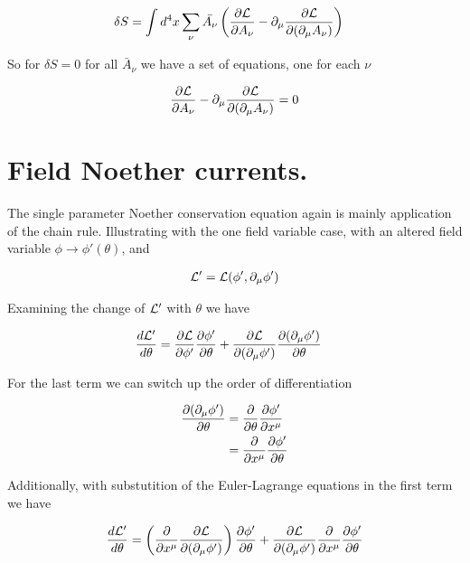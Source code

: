 \begin{align}\label{eqn:rotationCurrents:boo6}
\delta S
&=
\int d^4 x \sum_{\nu} \bar{A_\nu} \left( \PD{A_\nu}{\LL} - \partial_\mu \PD{(\partial_\mu A_\nu)}{\LL} \right)
\end{align}

So for $\delta S = 0$ for all $\bar{A}_\nu$ we have a set of equations, one for each $\nu$

\begin{align}\label{eqn:rotationCurrents:boo7}
\PD{A_\nu}{\LL} - \partial_\mu \PD{(\partial_\mu A_\nu)}{\LL} = 0
\end{align}

\section{Field Noether currents.}

The single parameter Noether conservation equation again is mainly application of the chain rule.  Illustrating with the one field variable case, with an altered field variable $\phi \rightarrow \phi'(\theta)$, and

\begin{align}\label{eqn:rotationCurrents:moo1}
\LL' = \LL(\phi', \partial_\mu \phi')
\end{align}

Examining the change of $\LL'$ with $\theta$ we have

\begin{align*}
\frac{d \LL'}{d \theta}
&=
\PD{\phi'}{\LL} \PD{\theta}{\phi'}
+\PD{(\partial_\mu \phi')}{\LL}
\PD{\theta}{(\partial_\mu \phi')}
\end{align*}

For the last term we can switch up the order of differentiation

\begin{align*}
\PD{\theta}{(\partial_\mu \phi')}
&=
\PD{\theta}{}
\PD{x^\mu}{\phi'} \\
&= \PD{x^\mu}{} \PD{\theta}{\phi'}
\end{align*}

Additionally, with substutition of the Euler-Lagrange equations in the first term we have

\begin{align*}
\frac{d \LL'}{d \theta}
&=
\left( \PD{x^\mu}{} \PD{(\partial_\mu \phi')}{\LL} \right) \PD{\theta}{\phi'}
+\PD{(\partial_\mu \phi')}{\LL} \PD{x^\mu}{} \PD{\theta}{\phi'} \\
\end{align*}

